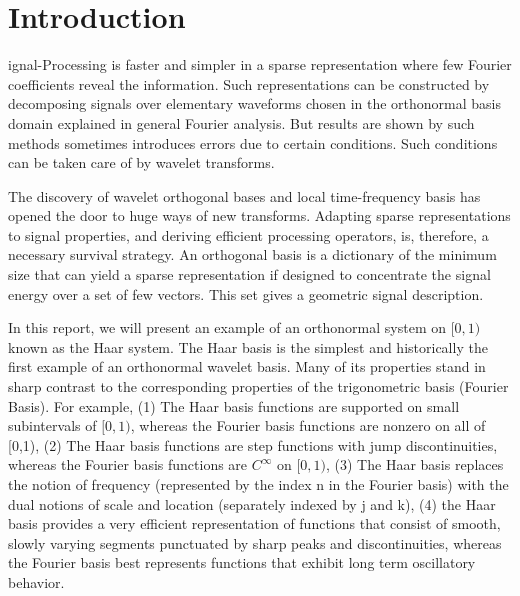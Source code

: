 %
%
\let\textcircled=\pgftextcircled
\section{Introduction}
\label{chap:intro}

ignal-Processing is faster and simpler in a sparse representation where few Fourier coefficients reveal the information. Such representations can be constructed by decomposing signals over elementary waveforms chosen in the orthonormal basis domain explained in general Fourier analysis. But results are shown by such methods sometimes introduces errors due to certain conditions. Such conditions can be taken care of by wavelet transforms. 

\par
The discovery of wavelet orthogonal bases and local time-frequency basis has opened the door to huge ways of new transforms. Adapting sparse representations to signal properties, and deriving efficient processing operators, is, therefore, a necessary survival strategy. An orthogonal basis is a dictionary of the minimum size that can yield a sparse representation if designed to concentrate the signal energy over a set of few vectors. This set gives a geometric signal description.

\par
In this report, we will present an example of an orthonormal system on $[0,1)$ known as the Haar system. The Haar basis is the simplest and historically the first example of an orthonormal wavelet basis. Many of its properties stand in sharp contrast to the corresponding properties of the trigonometric basis (Fourier Basis). For example, 
(1) The Haar basis functions are supported on small subintervals of $[0,1)$, whereas the Fourier basis functions are nonzero on all of [0,1), (2) The Haar basis functions are step functions with jump discontinuities, whereas the Fourier basis functions are $C^\infty$ on $[0,1)$, (3) The Haar basis replaces the notion of frequency (represented by the index n in the Fourier basis) with the dual notions of scale and location (separately indexed by j and k), (4) the Haar basis provides a very efficient representation of functions that consist of smooth, slowly varying segments punctuated by sharp peaks and discontinuities, whereas the Fourier basis best represents functions that exhibit long term oscillatory behavior. 



